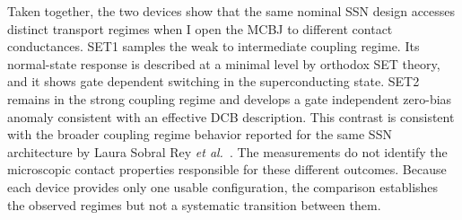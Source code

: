     Taken together, the two devices show that the same nominal SSN design accesses distinct transport regimes when I open the MCBJ to different contact conductances. SET1 samples the weak to intermediate coupling regime. Its normal-state response is described at a minimal level by orthodox SET theory, and it shows gate dependent switching in the superconducting state. SET2 remains in the strong coupling regime and develops a gate independent zero-bias anomaly consistent with an effective DCB description. This contrast is consistent with the broader coupling regime behavior reported for the same SSN architecture by Laura Sobral Rey \textit{et al.}~\cite{sobral_rey_hybrid_sset_2024,sobral_rey_interplay_2022}. The measurements do not identify the microscopic contact properties responsible for these different outcomes. Because each device provides only one usable configuration, the comparison establishes the observed regimes but not a systematic transition between them.
